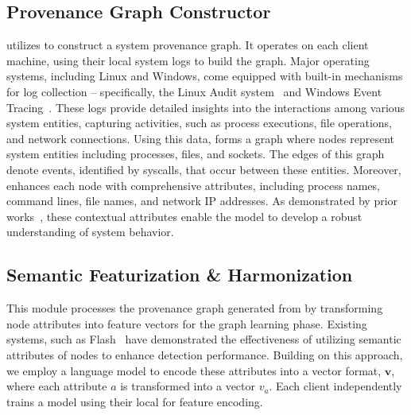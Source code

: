 




\subsection{Provenance Graph Constructor}
\label{provconstruct}

\Sys utilizes \logs to construct a system provenance graph. It operates on each client machine, using their local system logs to build the graph. Major operating systems, including Linux and Windows, come equipped with built-in mechanisms for log collection -- specifically, the Linux Audit system~\cite{linuxaudit} and Windows Event Tracing~\cite{windowsaudit}. These logs provide detailed insights into the interactions among various system entities, capturing activities, such as process executions, file operations, and network connections. Using this data, \Sys forms a graph where nodes represent system entities including processes, files, and sockets. The edges of this graph denote events, identified by syscalls, that occur between these entities. Moreover, \Sys enhances each node with comprehensive attributes, including process names, command lines, file names, and network IP addresses. As demonstrated by prior works~\cite{flash2024,cheng2023kairos}, these contextual attributes enable the model to develop a robust understanding of system behavior.


\subsection{Semantic Featurization \& Harmonization}
\label{semanfeat}

This module processes the provenance graph generated from \logs by transforming node attributes into feature vectors for the graph learning phase. Existing systems, such as Flash~\cite{flash2024} have demonstrated the effectiveness of utilizing semantic attributes of nodes to enhance detection performance. Building on this approach, we employ a \wordvec language model to encode these attributes into a vector format, \(\mathbf{v}\), where each attribute \(a\) is transformed into a vector \(v_a\). Each client independently trains a \wordvec model using their local \logs for feature encoding.

